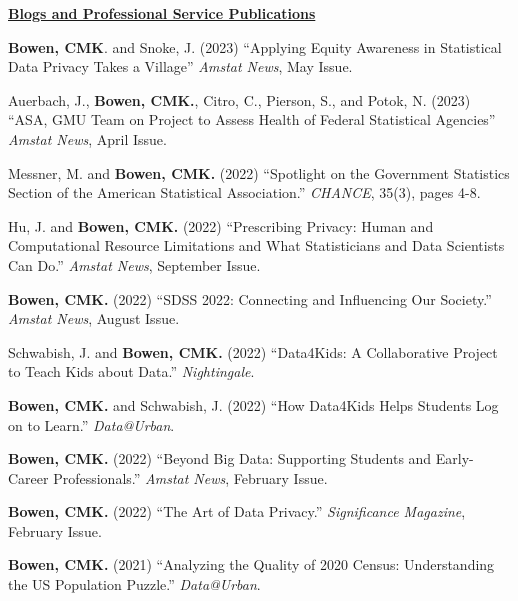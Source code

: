 \vspace{4pt}
\noindent\underline{\textbf{Blogs and Professional Service Publications}}
\vspace{4pt}
\begin{etaremune}[topsep=0pt, itemsep=5pt, partopsep=0pt, parsep=0pt]
    \item \textbf{Bowen, CMK}. and Snoke, J. (2023) ``Applying Equity Awareness in Statistical Data Privacy Takes a Village'' \textit{Amstat News}, May Issue.
    
    \item Auerbach, J., \textbf{Bowen, CMK.}, Citro, C., Pierson, S., and Potok, N. (2023) ``ASA, GMU Team on Project to Assess Health of Federal Statistical Agencies'' \textit{Amstat News}, April Issue.
    
    \item Messner, M. and \textbf{Bowen, CMK.} (2022) ``Spotlight on the Government Statistics Section of the American Statistical Association.'' \textit{CHANCE}, 35(3), pages 4-8.
    
    \item Hu, J. and \textbf{Bowen, CMK.} (2022) ``Prescribing Privacy: Human and Computational Resource Limitations and What Statisticians and Data Scientists Can Do.'' \textit{Amstat News}, September Issue.
    
    \item \textbf{Bowen, CMK.} (2022) ``SDSS 2022: Connecting and Influencing Our Society.'' \textit{Amstat News}, August Issue.
    
    \item Schwabish, J. and \textbf{Bowen, CMK.} (2022) ``Data4Kids: A Collaborative Project to Teach Kids about Data.'' \textit{Nightingale}.
    
    \item \textbf{Bowen, CMK.} and Schwabish, J. (2022) ``How Data4Kids Helps Students Log on to Learn.'' \textit{Data@Urban}.

    \item \textbf{Bowen, CMK.} (2022) ``Beyond Big Data: Supporting Students and Early-Career Professionals.'' \textit{Amstat News}, February Issue.
    
    \item \textbf{Bowen, CMK.} (2022) ``The Art of Data Privacy.'' \textit{Significance Magazine}, February Issue.
    
    \item \textbf{Bowen, CMK.} (2021) ``Analyzing the Quality of 2020 Census: Understanding the US Population Puzzle.'' \textit{Data@Urban}.


\end{etaremune}
